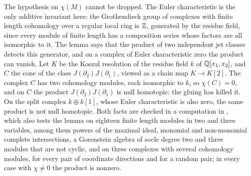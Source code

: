 The hypothesis on $\chi(M)$ cannot be dropped. The Euler characteristic is
the only additive invariant here: the Grothendieck group of complexes with
finite length cohomology over a regular local ring is $\mathbb{Z}$, generated by the
residue field, since every module of finite length has a composition series
whose factors are all isomorphic to it. The lemma says that the product of two
independent jet classes detects this generator, and on a complex of Euler
characteristic zero the product can vanish. Let $K$ be the Koszul resolution
of the residue field $k$ of $\mathbb{Q}[x_{1},x_{2}]$, and $C$ the cone of the class
$J(\partial_{2})J(\partial_{1})$, viewed as a chain map $K\to K[2]$. The
complex $C$ has two cohomology modules, each isomorphic to $k$, so
$\chi(C)=0$, and on $C$ the product $J(\partial_{2})J(\partial_{1})$ is null
homotopic: the gluing has killed it. On the split complex $k\oplus k[1]$,
whose Euler characteristic is also zero, the same product is not null
homotopic. Both facts are checked in a computation in \cite{BMB26},
which also tests the lemma on eighteen finite length modules in two and three
variables, among them powers of the maximal ideal, monomial and non-monomial
complete intersections, a Gorenstein algebra of socle degree two and three
modules that are not cyclic, and on three complexes with several cohomology
modules, for every pair of coordinate directions and for a random pair; in
every case with $\chi\ne0$ the product is nonzero.

